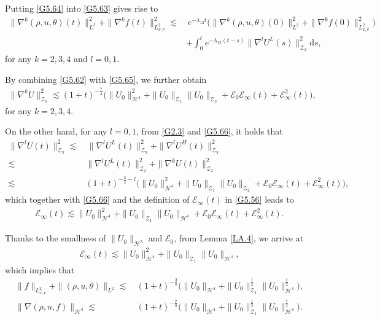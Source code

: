 \documentclass[reqno,11pt]{amsart}
\theoremstyle{plain}
\numberwithin{equation}{section}
\begin{document}
Putting   \eqref{G5.64} into \eqref{G5.63} gives rise to
\begin{align}\label{G5.65}
 \|\nabla^k(\rho,u,\theta)(t)\|_{L^2}^2+\|\nabla^k f(t)\|_{L_{x,v}^2}^2
\lesssim&\, e^{-\lambda_{12}t}\big( \|\nabla^k(\rho,u,\theta)(0)\|_{L^2}^2
+\|\nabla^k f(0)\|_{L_{x,v}^2}^2\big) \nonumber\\
& +\int_{0}^te^{-\lambda_{12}(t-s)} \|\nabla^l U^L(s)\|_{\mathcal{Z}_2}^2\mathrm{d}s,  
\end{align}
for any $k=2,3,4$ and $l=0,1$.

By combining \eqref{G5.62} with \eqref{G5.65}, we further obtain  
\begin{align}\label{G5.66}
\|\nabla^k U\|_{\mathcal{Z}_2}^2\lesssim (1+t)^{-\frac{7}{4}}\big(\|U_0\|_{\mathcal{H}^4}^2+\|U_0\|_{\mathcal{Z}_1}\|U_0\|_{\mathcal{Z}_2}
+\mathcal{E}_0\mathcal{E}_{ \infty}(t)+\mathcal{E}_{ \infty}^2(t)    \big),
\end{align}
for any $k=2,3,4$.

On the other hand, for any $l=0,1$, from \eqref{G2.3} and \eqref{G5.66}, it holds that
\begin{align*}
\|\nabla^l U(t)\|_{\mathcal{Z}_2}^2\lesssim &\,\|\nabla^l U^L(t)\|_{\mathcal{Z}_2}^2+\|\nabla^l U^H(t)\|_{\mathcal{Z}_2}^2\nonumber\\
\lesssim\,& \|\nabla^l U^L(t)\|_{\mathcal{Z}_2}^2+\|\nabla^k U(t)\|_{\mathcal{Z}_2}^2\nonumber\\
\lesssim\,&(1+t)^{-\frac{3}{4}-l}\big(\|U_0\|_{\mathcal{H}^4}^2
+\|U_0\|_{\mathcal{Z}_1}\|U_0\|_{\mathcal{Z}_2}+\mathcal{E}_0\mathcal{E}_{\infty}(t)
+\mathcal{E}_{\infty}^2(t)    \big),
\end{align*}
which together with \eqref{G5.66} and the definition of
$\mathcal{E}_{\infty}(t)$ in \eqref{G5.56} leads to
\begin{align*}
\mathcal{E}_{\infty}(t)\lesssim  \|U_0\|_{\mathcal{H}^4}^2+\|U_0\|_{\mathcal{Z}_1}\|U_0\|_{\mathcal{H}^4}+\mathcal{E}_0\mathcal{E}_{ \infty}(t)
+\mathcal{E}_{ \infty}^2(t).   
\end{align*}

Thanks to the smallness of $\|U_0\|_{\mathcal{H}^3}$ and $\mathcal{E}_0$, from Lemma \ref{LA.4}, we arrive at 
\begin{align*}
\mathcal{E}_{\infty}(t)\lesssim  \|U_0\|_{\mathcal{H}^4}^2+\|U_0\|_{\mathcal{Z}_1}\|U_0\|_{\mathcal{H}^4},
\end{align*}
which implies that 
\begin{align}\label{decay-a}
\|f\|_{L_{x,v}^2}+\|(\rho,u,\theta)\|_{L^2} \lesssim&\, (1+t)^{-\frac{3}{8}}\big(\|U_0\|_{\mathcal{H}^4}+\|U_0\|_{\mathcal{Z}_1}^{\frac{1}{2}}\|U_0\|_{\mathcal{H}^4}^{\frac{1}{2}}   \big),  \\\label{decay-b}
\|\nabla ( \rho,u,f)\|_{\mathcal{H}^3}\lesssim&\,(1+t)^{-\frac{7}{8}}\big(\|U_0\|_{\mathcal{H}^4}+\|U_0\|_{\mathcal{Z}_1}^{\frac{1}{2}}\|U_0\|_{\mathcal{H}^4}^{\frac{1}{2}}   \big).
\end{align}
\end{document}
